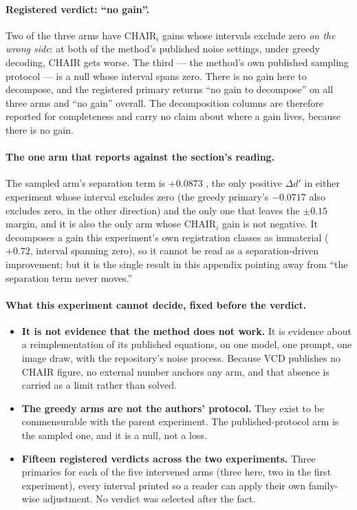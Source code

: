 \paragraph{Registered verdict: ``no gain''.} Two of the three arms have $\mathrm{CHAIR}_i$ gains
whose intervals exclude zero \emph{on the wrong side}: at both of the method's published noise
settings, under greedy decoding, CHAIR gets worse. The third --- the method's own published sampling
protocol --- is a null whose interval spans zero. There is no gain here to decompose, and the
registered primary returns ``no gain to decompose'' on all three arms and ``no gain''
overall. The decomposition columns are therefore reported for completeness and carry no claim about
where a gain lives, because there is no gain.

\paragraph{The one arm that reports against the section's reading.} The sampled arm's separation term
is $+0.0873$ , the only positive $\Delta d'$ in either experiment whose interval
excludes zero (the greedy primary's $-0.0717$  also excludes zero, in the other
direction) and the only one that leaves the $\pm 0.15$ margin, and it is also the only arm whose
$\mathrm{CHAIR}_i$ gain is not negative. It decomposes a gain this experiment's own registration classes as
immaterial ($+0.72$, interval spanning zero), so it cannot be read as a separation-driven
improvement; but it is the single result in this appendix pointing away from ``the separation term
never moves.'' 

\paragraph{What this experiment cannot decide, fixed before the verdict.}
\begin{itemize}
\itemsep0em
\item \textbf{It is not evidence that the method does not work.} It is evidence about a
reimplementation of its published equations, on one model, one prompt, one image draw, with the
repository's noise process. Because VCD publishes no CHAIR figure, no external number anchors any arm,
and that absence is carried as a limit rather than solved.
\item \textbf{The greedy arms are not the authors' protocol.} They exist to be commensurable with the
parent experiment. The published-protocol arm is the sampled one, and it is a null, not a loss.
\item \textbf{Fifteen registered verdicts across the two experiments.} Three primaries for each of the five
intervened arms (three here, two in the first experiment), every interval printed so a reader can apply their own family-wise adjustment. No
verdict was selected after the fact.
\end{itemize}

